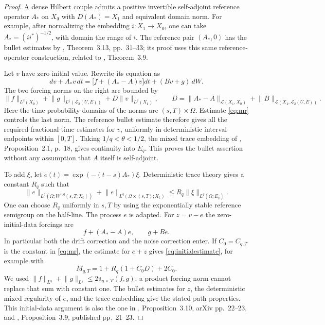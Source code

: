 \documentclass[11pt]{amsart}
\theoremstyle{definition}
\theoremstyle{remark}
\newcommand{\HS}{\mathcal L_2(U,E)}
\newcommand{\norm}[2][]{\lVert #2\rVert_{#1}}
\numberwithin{equation}{section}
\begin{document}
\begin{proof}
A dense Hilbert couple admits a positive invertible self-adjoint reference
operator $A_*$ on $X_0$ with $D(A_*)=X_1$ and equivalent domain norm.
For example, after normalizing the embedding $i:X_1\to X_0$, one can
take $A_*=(ii^*)^{-1/2}$, with domain the range of $i$.
The reference pair $(A_*,0)$ has the bullet estimates by
\cite{Survey}, Theorem~3.13, pp.~31--33; its proof uses this same
reference-operator construction, related to \cite{PV}, Theorem~3.9.

Let $v$ have zero initial value. Rewrite its equation as
\[
 dv+A_*v\,dt=\bigl[f+(A_*-A)v\bigr]dt+(Bv+g)\,dW.
\]
The two forcing norms on the right are bounded by
\[
 \norm[L^q(X_0)]{f}+\norm[L^q(\HS)]{g}
 +D\norm[L^q(X_1)]{v},\qquad
 D=\norm[\mathcal L(X_1,X_0)]{A_*-A}
    +\norm[\mathcal L(X_1,\HS)]{B}.
\]
Here the time-probability domains of the norms are $(s,T)\times\Omega$.
Estimate \eqref{eq:mr} controls the last norm. The reference bullet
estimate therefore gives all the required fractional-time estimates for
$v$, uniformly in deterministic interval endpoints within $[0,T]$.
Taking $1/q<\theta<1/2$, the mixed trace embedding of
\cite{Survey}, Proposition~2.1, p.~18, gives continuity into $E_q$.
This proves the bullet assertion without any assumption that $A$ itself
is self-adjoint.

To add $\xi$, let $e(t)=\exp(-(t-s)A_*)\xi$. Deterministic trace theory
gives a constant $R_q$ such that
\[
 \norm[L^q(\Omega;W^{1,q}(s,T;X_0))]{e}
 +\norm[L^q(\Omega\times(s,T);X_1)]{e}
 \le R_q\norm[L^q(\Omega;E_q)]{\xi}.
\]
One can choose $R_q$ uniformly in $s,T$ by using the exponentially
stable reference semigroup on the half-line. The process $e$ is adapted.
For $z=v-e$ the zero-initial-data forcings are
\begin{equation}\label{eq:corrections}
 f+(A_*-A)e,\qquad g+Be.
\end{equation}
In particular both the drift correction and the noise correction enter.
If $C_0=C_{q,T}$ is the constant in \eqref{eq:mr}, the estimate for
$e+z$ gives \eqref{eq:initialestimate}, for example with
\begin{equation}\label{eq:constant}
 M_{q,T}=1+R_q(1+C_0D)+2C_0.
\end{equation}
We used $\norm[L^q]{f}+\norm[L^q]{g}
\le2\mathfrak n_{q,s,T}(f,g)$; a product forcing norm cannot replace
that sum with constant one. The bullet estimates for $z$, the deterministic
mixed regularity of $e$, and the trace embedding give the stated path
properties. This initial-data argument is also the one in
\cite{AVI}, Proposition~3.10, arXiv pp.~22--23, and
\cite{AVII}, Proposition~3.9, published pp.~21--23.
\end{proof}
\end{document}
